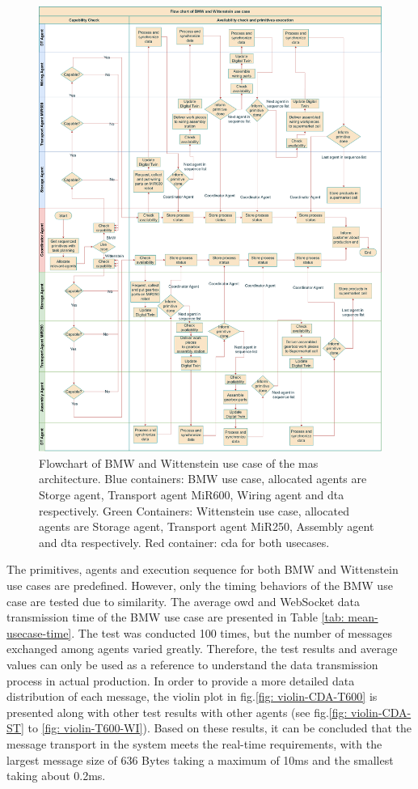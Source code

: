 \begin{figure}[htb]
    \includegraphics[width=\textwidth]{figures/tests/usecase/Usecase_flow.pdf}\hfill 
    \caption{Flowchart of BMW and Wittenstein use case of the \gls{mas} architecture. 
    Blue containers: BMW use case, allocated agents are Storge agent, 
    Transport agent MiR600, Wiring agent and \gls{dta} respectively. 
    Green Containers: Wittenstein use case, allocated agents are Storage agent, 
    Transport agent MiR250, Assembly agent and \gls{dta} respectively. 
    Red container: \gls{cda} for both usecases.} 
    \label{fig: Flowchart-usecase}
\end{figure}
The primitives, agents and execution sequence for both BMW and Wittenstein use cases 
are predefined. However, only the timing behaviors of the BMW use case are tested due 
to similarity. The average \gls{owd} and WebSocket data transmission time of the BMW 
use case are presented in Table \ref{tab: mean-usecase-time}. The test was conducted 
100 times, but the number of messages exchanged among agents varied greatly. Therefore, 
the test results and average values can only be used as a reference to understand the 
data transmission process in actual production. In order to provide a more detailed data 
distribution of each message, the violin plot in fig.\ref{fig: violin-CDA-T600} is 
presented along with other test results with other agents (see fig.\ref{fig: violin-CDA-ST} to \ref{fig: violin-T600-WI}). 
Based on these results, it can be concluded that the message transport in the system meets 
the real-time requirements, with the largest message size of 636 Bytes taking a maximum of 
10ms and the smallest taking about 0.2ms.


